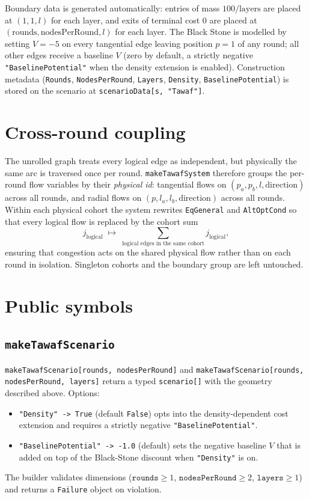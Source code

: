 \documentclass[11pt]{article}
\begin{document}
Boundary data is generated automatically: entries of mass $100/\text{layers}$ are placed at $(1, 1, l)$ for each layer, and exits of terminal cost $0$ are placed at $(\text{rounds}, \text{nodesPerRound}, l)$ for each layer. The Black Stone is modelled by setting $V = -5$ on every tangential edge leaving position $p = 1$ of any round; all other edges receive a baseline $V$ (zero by default, a strictly negative \texttt{"BaselinePotential"} when the density extension is enabled). Construction metadata (\texttt{Rounds}, \texttt{NodesPerRound}, \texttt{Layers}, \texttt{Density}, \texttt{BaselinePotential}) is stored on the scenario at \texttt{scenarioData[s, "Tawaf"]}.

\section{Cross-round coupling}

The unrolled graph treats every logical edge as independent, but physically the same arc is traversed once per round. \texttt{makeTawafSystem} therefore groups the per-round flow variables by their \emph{physical id}: tangential flows on $(p_a, p_b, l, \text{direction})$ across all rounds, and radial flows on $(p, l_a, l_b, \text{direction})$ across all rounds. Within each physical cohort the system rewrites \texttt{EqGeneral} and \texttt{AltOptCond} so that every logical flow is replaced by the cohort sum
\[
j_{\text{logical}} \;\mapsto\; \sum_{\text{logical edges in the same cohort}} j_{\text{logical}},
\]
ensuring that congestion acts on the shared physical flow rather than on each round in isolation. Singleton cohorts and the boundary group are left untouched.

\section{Public symbols}

\subsection*{\texttt{makeTawafScenario}}

\texttt{makeTawafScenario[rounds, nodesPerRound]} and \texttt{makeTawafScenario[rounds, nodesPerRound, layers]} return a typed \texttt{scenario[\textellipsis]} with the geometry described above. Options:
\begin{itemize}
\item \texttt{"Density" -> True} (default \texttt{False}) opts into the density-dependent cost extension and requires a strictly negative \texttt{"BaselinePotential"}.
\item \texttt{"BaselinePotential" -> -1.0} (default) sets the negative baseline $V$ that is added on top of the Black-Stone discount when \texttt{"Density"} is on.
\end{itemize}
The builder validates dimensions ($\texttt{rounds} \ge 1$, $\texttt{nodesPerRound} \ge 2$, $\texttt{layers} \ge 1$) and returns a \texttt{Failure} object on violation.
\end{document}
